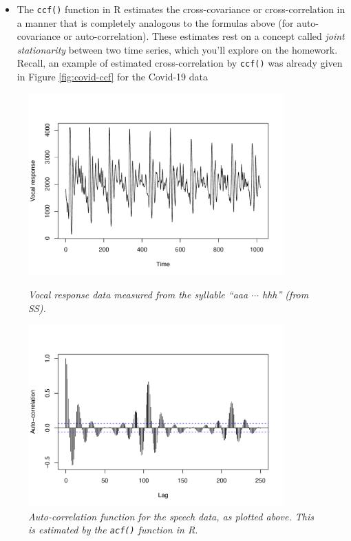 \documentclass{article}
\begin{document}
\begin{itemize}
\item The \verb|ccf()| function in R estimates the cross-covariance or
  cross-correlation in a manner that is completely analogous to the formulas
  above (for auto-covariance or auto-correlation). These estimates rest on a
  concept called \emph{joint stationarity} between two time series, which you'll
  explore on the homework. Recall, an example of estimated cross-correlation by 
  \verb|ccf()| was already given in Figure \ref{fig:covid-ccf} for the Covid-19
  data  
\end{itemize}

\begin{figure}[p]
\centering
\includegraphics[width=0.875\textwidth]{fig/speech-1.pdf}
\caption{\it Vocal response data measured from the syllable ``aaa $\cdots$ hhh''
  (from SS).}  
\label{fig:speech-ts}

\includegraphics[width=0.875\textwidth]{fig/speech-2.pdf}
\cprotect\caption{\it Auto-correlation function for the speech data, as plotted 
  above. This is estimated by the \verb|acf()| function in R.}   
\label{fig:speech-acf}
\end{figure}
\end{document}
